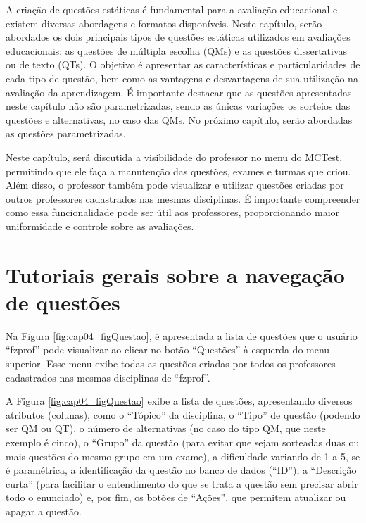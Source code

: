 \label{ch:questoesClassicasMCTest}

A criação de questões estáticas é fundamental para a avaliação educacional e existem diversas abordagens e formatos disponíveis. Neste capítulo, serão abordados os dois principais tipos de questões estáticas utilizados em avaliações educacionais: as questões de múltipla escolha (QMs) e as questões dissertativas ou de texto (QTs). O objetivo é apresentar as características e particularidades de cada tipo de questão, bem como as vantagens e desvantagens de sua utilização na avaliação da aprendizagem. É importante destacar que as questões apresentadas neste capítulo não são parametrizadas, sendo as únicas variações os sorteios das questões e alternativas, no caso das QMs. No próximo capítulo, serão abordadas as questões parametrizadas.

Neste capítulo, será discutida a visibilidade do professor no menu do MCTest, permitindo que ele faça a manutenção das questões, exames e turmas que criou. Além disso, o professor também pode visualizar e utilizar questões criadas por outros professores cadastrados nas mesmas disciplinas.  É importante compreender como essa funcionalidade pode ser útil aos professores, proporcionando maior uniformidade e controle sobre as avaliações.

\section{Tutoriais gerais sobre a navegação de questões}\label{sec:questaoNavegacao}

Na Figura \ref{fig:cap04_figQuestao}, é apresentada a lista de questões que o usuário ``fzprof'' pode visualizar ao clicar no botão ``Questões'' à esquerda do menu superior. Esse menu exibe todas as questões criadas por todos os professores cadastrados nas mesmas disciplinas de ``fzprof''.

A Figura \ref{fig:cap04_figQuestao} exibe a lista de questões, apresentando diversos atributos (colunas), como o ``Tópico'' da disciplina, o ``Tipo'' de questão (podendo ser QM ou QT), o número de alternativas (no caso do tipo QM, que neste exemplo é cinco), o ``Grupo'' da questão (para evitar que sejam sorteadas duas ou mais questões do mesmo grupo em um exame), a dificuldade variando de 1 a 5, se é paramétrica, a identificação da questão no banco de dados (``ID''), a ``Descrição curta'' (para facilitar o entendimento do que se trata a questão sem precisar abrir todo o enunciado) e, por fim, os botões de ``Ações'', que permitem atualizar ou apagar a questão. 

